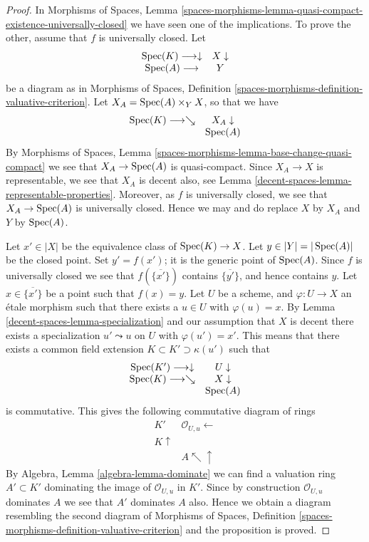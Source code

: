 \begin{proof}
In
Morphisms of Spaces,
Lemma \ref{spaces-morphisms-lemma-quasi-compact-existence-universally-closed}
we have seen one of the implications.
To prove the other, assume that $f$ is universally closed. Let
$$
\begin{array}{cc}\operatorname{Spec}(K) \longrightarrow\downarrow & X \downarrow \\ \operatorname{Spec}(A) \longrightarrow & Y\end{array}
$$
be a diagram as in
Morphisms of Spaces,
Definition \ref{spaces-morphisms-definition-valuative-criterion}.
Let $X_A = \operatorname{Spec}(A) \times_Y X$, so that we have
$$
\begin{array}{cc}\operatorname{Spec}(K) \longrightarrow\searrow & X_A \downarrow \\  & \operatorname{Spec}(A)\end{array}
$$
By
Morphisms of Spaces,
Lemma \ref{spaces-morphisms-lemma-base-change-quasi-compact}
we see that $X_A \to \operatorname{Spec}(A)$ is quasi-compact. Since $X_A \to X$
is representable, we see that $X_A$ is decent also, see
Lemma \ref{decent-spaces-lemma-representable-properties}.
Moreover, as $f$ is universally closed, we see that $X_A \to \operatorname{Spec}(A)$
is universally closed.
Hence we may and do replace $X$ by $X_A$ and $Y$ by $\operatorname{Spec}(A)$.

\medskip\noindent
Let $x' \in |X|$ be the equivalence class of
$\operatorname{Spec}(K) \to X$. Let $y \in |Y| = |\operatorname{Spec}(A)|$ be
the closed point. Set $y' = f(x')$; it is the generic point of
$\operatorname{Spec}(A)$. Since $f$ is universally closed we see that
$f(\overline{\{x'\}})$ contains $\overline{\{y'\}}$, and hence
contains $y$. Let $x \in \overline{\{x'\}}$ be a point such that
$f(x) = y$. Let $U$ be a scheme, and $\varphi : U \to X$
an \'etale morphism such that there exists a $u \in U$ with
$\varphi(u) = x$. By
Lemma \ref{decent-spaces-lemma-specialization}
and our assumption that $X$ is decent
there exists a specialization $u' \leadsto u$ on $U$ with $\varphi(u') = x'$.
This means that there exists a common field extension
$K \subset K' \supset \kappa(u')$ such that
$$
\begin{array}{cc}\operatorname{Spec}(K') \longrightarrow\downarrow & U \downarrow \\ \operatorname{Spec}(K) \longrightarrow\searrow & X \downarrow \\  & \operatorname{Spec}(A)\end{array}
$$
is commutative. This gives the following commutative diagram of rings
$$
\begin{array}{cc}K' & \mathcal{O}_{U, u} \longleftarrow \\ K \uparrow &  \\  & A \nwarrow\uparrow\end{array}
$$
By
Algebra, Lemma \ref{algebra-lemma-dominate}
we can find a valuation ring $A' \subset K'$ dominating the image of
$\mathcal{O}_{U, u}$ in $K'$. Since by construction $\mathcal{O}_{U, u}$
dominates $A$ we see that $A'$ dominates $A$ also. Hence we obtain a diagram
resembling the second diagram of
Morphisms of Spaces,
Definition \ref{spaces-morphisms-definition-valuative-criterion}
and the proposition is proved.
\end{proof}

